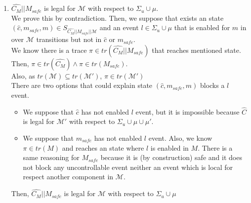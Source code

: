 \begin{enumerate}
\begin{enumerate}
        \item $\hat{C_{M}} || M_{safe}$ is legal for $\mathcal{M}$ with respect to $\Sigma_u \cup \mu$. \\
        We prove this by contradiction. Then, we suppose that exists an state $(\hat{c}, m_{safe}, m) \in S_{\hat{C_{M}} || M_{safe}||\mathcal{M}}$ and an event $l \in \Sigma_u \cup \mu$ that is enabled for $m$ in over $\mathcal{M}$ transitions but not in $\hat{c}$ or $m_{safe}$. \\
        We know there is a trace $\pi \in tr(\hat{C_M} || M_{safe})$ that reaches mentioned state. \\
        Then, $\pi \in tr(\hat{C_M}) \wedge \pi \in tr(M_{safe})$. \\
        Also, as $tr(\mathcal{M}) \subseteq tr(\mathcal{M'})$, $\pi \in tr(\mathcal{\mathcal{M'}})$ \\
        There are two options that could explain state $(\hat{c}, m_{safe}, m)$ blocks a $l$ event.
        \begin{itemize}
            \item We suppose that $\hat{c}$ has not enabled $l$ event, but it is impossible because $\hat{C}$ is legal for $\mathcal{M'}$ with respect to $\Sigma_u \cup \mu \cup \mu'$.
            \item We suppose that $m_{safe}$ has not enabled $l$ event. Also, we know $\pi \in tr(M)$ and reaches an state where $l$ is enabled in $M$. There is a same reasoning for $M_{safe}$ because it is (by construction) safe and it does not block any uncontrollable event neither an event which is local for respect another component in $\mathcal{M}$.
        \end{itemize}
        Then, $\hat{C_{M}} || M_{safe}$ is legal for $\mathcal{M}$ with respect to $\Sigma_u \cup \mu$       
        






\end{enumerate}
\end{enumerate}
